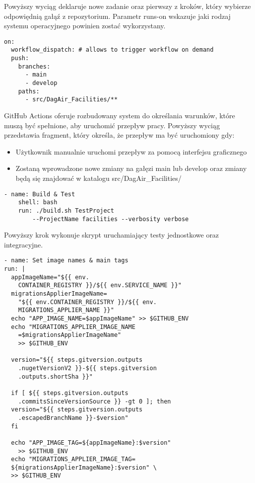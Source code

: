 Powyższy wyciąg deklaruje nowe zadanie oraz pierwszy z kroków, który wybierze 
odpowiędnią gałąź z repozytorium. Parametr runs-on wskazuje jaki rodzaj systemu 
operacyjnego powinien zostać wykorzystany.

\begin{lstlisting}
on:
  workflow_dispatch: # allows to trigger workflow on demand
  push:
    branches: 
      - main
      - develop
    paths:
      - src/DagAir_Facilities/**
\end{lstlisting}

GitHub Actions oferuje rozbudowany system do określania warunków, które muszą być 
spełnione, aby uruchomić przepływ pracy. Powyższy wyciąg przedstawia fragment, który 
określa, że przepływ ma być uruchomiony gdy:

\begin{itemize} %
    \item Użytkownik manualnie uruchomi przepływ za pomocą interfejsu graficznego
    \item Zostaną wprowadzone nowe zmiany na gałęzi main lub develop oraz zmiany będą 
    się znajdować w katalogu src/DagAir\_Facilities/
\end{itemize}

\begin{lstlisting}
- name: Build & Test
    shell: bash
    run: ./build.sh TestProject 
        --ProjectName facilities --verbosity verbose
\end{lstlisting}

Powyższy krok wykonuje skrypt uruchamiający testy jednostkowe oraz integracyjne.

\begin{lstlisting}
- name: Set image names & main tags
run: |
  appImageName="${{ env.
    CONTAINER_REGISTRY }}/${{ env.SERVICE_NAME }}"
  migrationsApplierImageName=
    "${{ env.CONTAINER_REGISTRY }}/${{ env.
    MIGRATIONS_APPLIER_NAME }}"
  echo "APP_IMAGE_NAME=$appImageName" >> $GITHUB_ENV
  echo "MIGRATIONS_APPLIER_IMAGE_NAME
    =$migrationsApplierImageName" 
    >> $GITHUB_ENV

  version="${{ steps.gitversion.outputs
    .nugetVersionV2 }}-${{ steps.gitversion
    .outputs.shortSha }}"

  if [ ${{ steps.gitversion.outputs
    .commitsSinceVersionSource }} -gt 0 ]; then
  version="${{ steps.gitversion.outputs
    .escapedBranchName }}-$version"
  fi

  echo "APP_IMAGE_TAG=${appImageName}:$version" 
    >> $GITHUB_ENV
  echo "MIGRATIONS_APPLIER_IMAGE_TAG=
  ${migrationsApplierImageName}:$version" \
  >> $GITHUB_ENV
\end{lstlisting}

